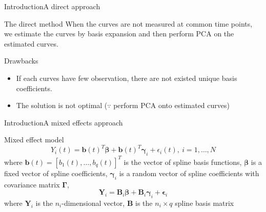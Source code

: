\documentclass{beamer}
\def \bY {\mathbf{Y}}
\def \bB {\mathbf{B}}
\def \bbeta {\boldsymbol{\beta}}
\def \bepsilon {\boldsymbol{\epsilon}}
\def \bgamma {\boldsymbol{\gamma}}
\def \bGamma {\boldsymbol{\Gamma}}
\begin{document}
\begin{frame}{Introduction}{A direct approach}
	\begin{block}{The direct method}
		When the curves are not measured at common time points, we estimate the curves by basis expansion and then perform PCA on the estimated curves.
	\end{block}
	\begin{block}{Drawbacks}
	\begin{itemize}
		\item {
			If each curves have few observation, there are not existed unique basis coefficients.
		}
		\item {
			The solution is not optimal ($\because$ perform PCA onto estimated curves)
		}
	\end{itemize}
	\end{block}
\end{frame}

\begin{frame}{Introduction}{A mixed effects approach}
	\begin{block}{Mixed effect model}
		$$ Y_i(t)=\mathbf{b}(t)^T\bbeta + \mathbf{b}(t)^T\bgamma_i+\epsilon_i(t), \ i=1,\dots,N $$
		where $\mathbf{b}(t)=[b_1(t),\dots,b_q(t)]^T $ is the vector of spline basis functions,
		$\bbeta$ is a fixed vector of spline coefficients, 
		$\bgamma_i$ is a random vector of spline coefficients with covariance matrix $\bGamma$, 
		$$ \bY_i=\bB_i\bbeta + \bB_i\bgamma_i + \bepsilon_i $$
		where $\bY_i$ is the $n_i$-dimensional vector, $\bB$ is the $n_i \times q$ spline basis matrix
	\end{block}
\end{frame}
\end{document}
